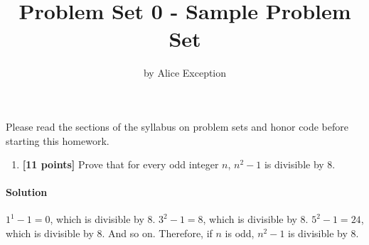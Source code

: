 \documentclass[11pt]{article}
\title{Problem Set 0 - Sample Problem Set}
\author{by Alice Exception}
\date{}
\begin{document}
\maketitle

Please read the sections of the syllabus on problem sets and honor code before starting this homework.


\begin{enumerate}
\item  \textbf{[11 points]} Prove that for every odd integer $n$, $n^2-1$ is divisible by 8. 

\end{enumerate}

{\paragraph{Solution} $1^1-1=0$, which is divisible by $8$. $3^2-1=8$, which is
divisible by $8$. $5^2-1=24$, which is divisible by $8$. And so on. Therefore, if
$n$ is odd, $n^2-1$ is divisible by $8.$ }
\end{document}
